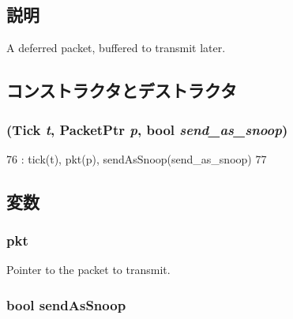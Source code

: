 \subsection{説明}
A deferred packet, buffered to transmit later. 

\subsection{コンストラクタとデストラクタ}
\hypertarget{classPacketQueue_1_1DeferredPacket_aeb2bea370e6bbb7c59fd8c65f2089ad8}{
\subsubsection[{DeferredPacket}]{ ({\bf Tick} {\em t}, \/  {\bf PacketPtr} {\em p}, \/  bool {\em send\_\-as\_\-snoop})}}
\label{classPacketQueue_1_1DeferredPacket_aeb2bea370e6bbb7c59fd8c65f2089ad8}



\begin{DoxyCode}
76             : tick(t), pkt(p), sendAsSnoop(send_as_snoop)
77         {}
\end{DoxyCode}


\subsection{変数}
\hypertarget{classPacketQueue_1_1DeferredPacket_a3a891bc2a0fcbe6be5297077d94e2df7}{
\subsubsection[{pkt}]{ {\bf pkt}}}
\label{classPacketQueue_1_1DeferredPacket_a3a891bc2a0fcbe6be5297077d94e2df7}


Pointer to the packet to transmit. \hypertarget{classPacketQueue_1_1DeferredPacket_af114b714a8c67e5b1c91da7937ae6227}{
\subsubsection[{sendAsSnoop}]{\setlength{\rightskip}{0pt plus 5cm}bool {\bf sendAsSnoop}}}
\label{classPacketQueue_1_1DeferredPacket_af114b714a8c67e5b1c91da7937ae6227}


